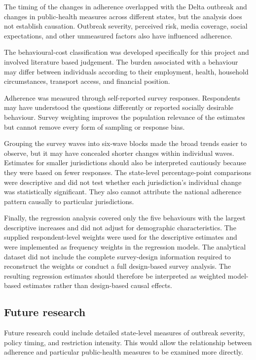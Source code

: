 \documentclass[
  12pt,
  a4paper,
]{article}
\begin{document}
The timing of the changes in adherence overlapped with the Delta outbreak and changes
in public-health measures across different states, but the analysis does not establish
causation. Outbreak severity, perceived risk, media coverage, social expectations, and other unmeasured factors also have influenced adherence.

The behavioural-cost classification was developed specifically for this
project and involved literature based judgement. The burden associated with a behaviour
may differ between individuals according to their employment, health,
household circumstances, transport access, and financial position.

Adherence was measured through self-reported survey responses.
Respondents may have understood the questions differently or reported
socially desirable behaviour. Survey weighting improves the population
relevance of the estimates but cannot remove every form of sampling or
response bias.

Grouping the survey waves into six-wave blocks made the broad trends
easier to observe, but it may have concealed shorter changes within
individual waves. Estimates for smaller jurisdictions should also be
interpreted cautiously because they were based on fewer responses. The
state-level percentage-point comparisons were descriptive and did not
test whether each jurisdiction's individual change was statistically
significant. They also cannot attribute the national adherence pattern
causally to particular jurisdictions.

Finally, the regression analysis covered only the five behaviours with
the largest descriptive increases and did not adjust for demographic
characteristics. The supplied respondent-level weights were used for the
descriptive estimates and were implemented as frequency weights in the
regression models. The analytical dataset did not include the complete
survey-design information required to reconstruct the weights or conduct
a full design-based survey analysis. The resulting regression estimates
should therefore be interpreted as weighted model-based estimates rather
than design-based causal effects.

\subsection{Future research}\label{future-research}

Future research could include detailed state-level measures of outbreak
severity, policy timing, and restriction intensity. This would allow the
relationship between adherence and particular public-health measures to
be examined more directly.
\end{document}
